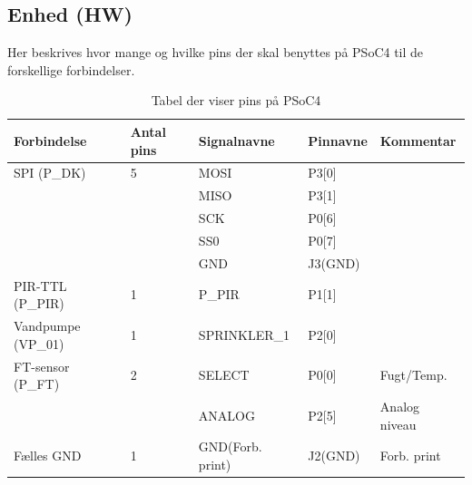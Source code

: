 \begin{table}[H]
\subsection{Enhed (HW)}
Her beskrives hvor mange og hvilke pins der skal benyttes på PSoC4 til de forskellige forbindelser.
\caption{Tabel der viser pins på PSoC4}
\begin{small}
\begin{tabular}{|p{}|p{2cm}|p{}|p{}|p{2.6cm}|}
\hline

\textbf{Forbindelse}	&\textbf{Antal pins} 	&\textbf{Signalnavne} &\textbf{Pinnavne} &\textbf{Kommentar}  \\ \hline

SPI 	(P\_DK)		&5 						&MOSI				&P3[0]		&					\\\cline{3-4}
					&						&MISO				&P3[1]		&					\\\cline{3-4}
					&						&SCK					&P0[6]		&					\\\cline{3-4}
					&						&SS0					&P0[7]		&					\\\cline{3-4}
					&						&GND					&J3(GND) 	&					\\\hline
	
PIR-TTL	(P\_PIR)	&1 						&P\_PIR				&P1[1] 		&					\\\hline

Vandpumpe (VP\_01)	&1 						&SPRINKLER\_1		&P2[0]		&					\\\hline

																								
		
FT-sensor (P\_FT)	&2						&SELECT				&P0[0]		&Fugt/Temp.			\\\cline{3-5}
					&						&ANALOG				&P2[5]		&Analog niveau		\\\hline
																											
					
Fælles GND			&1 						&GND(Forb. print)	&J2(GND) 	&Forb. print			\\\hline					
					


\end{tabular}
\end{small}
\label{table:enhed_forbindelse}
\end{table}

